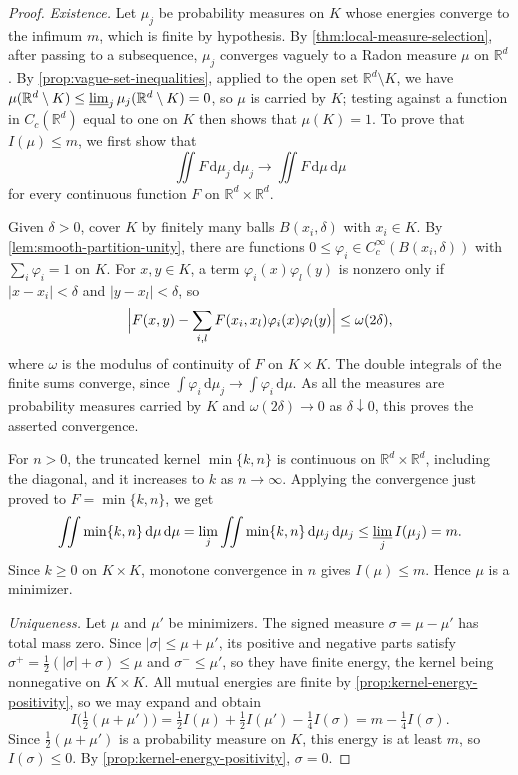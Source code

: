 \begin{proof}
\emph{Existence.} Let $\mu_j$ be probability measures on $K$ whose energies converge to the infimum $m$, which is finite by hypothesis. By \cref{thm:local-measure-selection}, after passing to a subsequence, $\mu_j$ converges vaguely to a Radon measure $\mu$ on $\mathbb R^d$. By \cref{prop:vague-set-inequalities}, applied to the open set $\mathbb R^d\setminus K$, we have $\mu(\mathbb R^d\setminus K)\leq\varliminf_j\mu_j(\mathbb R^d\setminus K)=0$, so $\mu$ is carried by $K$; testing against a function in $C_c(\mathbb R^d)$ equal to one on $K$ then shows that $\mu(K)=1$. To prove that $I(\mu)\leq m$, we first show that
\[
 \iint F\,\mathrm d\mu_j\,\mathrm d\mu_j\longrightarrow\iint F\,\mathrm d\mu\,\mathrm d\mu
\]
for every continuous function $F$ on $\mathbb R^d\times\mathbb R^d$.

Given $\delta>0$, cover $K$ by finitely many balls $B(x_i,\delta)$ with $x_i\in K$. By \cref{lem:smooth-partition-unity}, there are functions $0\leq\varphi_i\in C_c^\infty(B(x_i,\delta))$ with $\sum_i\varphi_i=1$ on $K$. For $x,y\in K$, a term $\varphi_i(x)\varphi_l(y)$ is nonzero only if $|x-x_i|<\delta$ and $|y-x_l|<\delta$, so
\[
 \Bigl|F(x,y)-\sum_{i,l}F(x_i,x_l)\varphi_i(x)\varphi_l(y)\Bigr|\leq\omega(2\delta),
\]
where $\omega$ is the modulus of continuity of $F$ on $K\times K$. The double integrals of the finite sums converge, since $\int\varphi_i\,\mathrm d\mu_j\to\int\varphi_i\,\mathrm d\mu$. As all the measures are probability measures carried by $K$ and $\omega(2\delta)\to0$ as $\delta\downarrow0$, this proves the asserted convergence.

For $n>0$, the truncated kernel $\min\{k,n\}$ is continuous on $\mathbb R^d\times\mathbb R^d$, including the diagonal, and it increases to $k$ as $n\to\infty$. Applying the convergence just proved to $F=\min\{k,n\}$, we get
\[
 \iint\min\{k,n\}\,\mathrm d\mu\,\mathrm d\mu=\lim_j\iint\min\{k,n\}\,\mathrm d\mu_j\,\mathrm d\mu_j\leq\varliminf_j I(\mu_j)=m.
\]
Since $k\geq0$ on $K\times K$, monotone convergence in $n$ gives $I(\mu)\leq m$. Hence $\mu$ is a minimizer.

\emph{Uniqueness.} Let $\mu$ and $\mu'$ be minimizers. The signed measure $\sigma=\mu-\mu'$ has total mass zero. Since $|\sigma|\leq\mu+\mu'$, its positive and negative parts satisfy $\sigma^+=\frac12(|\sigma|+\sigma)\leq\mu$ and $\sigma^-\leq\mu'$, so they have finite energy, the kernel being nonnegative on $K\times K$. All mutual energies are finite by \cref{prop:kernel-energy-positivity}, so we may expand and obtain
\[
 I\bigl(\tfrac12(\mu+\mu')\bigr)=\tfrac12I(\mu)+\tfrac12I(\mu')-\tfrac14I(\sigma)=m-\tfrac14I(\sigma).
\]
Since $\frac12(\mu+\mu')$ is a probability measure on $K$, this energy is at least $m$, so $I(\sigma)\leq0$. By \cref{prop:kernel-energy-positivity}, $\sigma=0$.


\end{proof}
